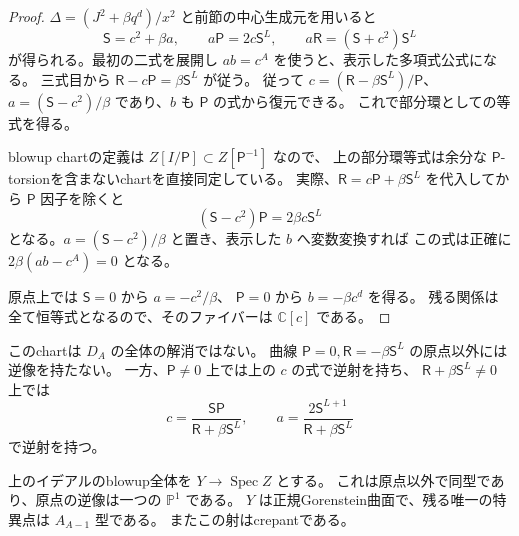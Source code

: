 \begin{proof}
$\Delta=(J^2+\beta q^d)/x^2$ と前節の中心生成元を用いると
\[
 \mathsf S=c^2+\beta a,\qquad
 a\mathsf P=2c\mathsf S^L,\qquad
 a\mathsf R=(\mathsf S+c^2)\mathsf S^L
\]
が得られる。最初の二式を展開し $ab=c^A$ を使うと、表示した多項式公式になる。
三式目から $\mathsf R-c\mathsf P=\beta\mathsf S^L$ が従う。
従って $c=(\mathsf R-\beta\mathsf S^L)/\mathsf P$、
$a=(\mathsf S-c^2)/\beta$ であり、$b$ も $\mathsf P$ の式から復元できる。
これで部分環としての等式を得る。

blowup chartの定義は $Z[I/\mathsf P]\subset Z[\mathsf P^{-1}]$ なので、
上の部分環等式は余分な $\mathsf P$-torsionを含まないchartを直接同定している。
実際、$\mathsf R=c\mathsf P+\beta\mathsf S^L$ を代入してから
$\mathsf P$ 因子を除くと
\[
 (\mathsf S-c^2)\mathsf P=2\beta c\mathsf S^L
\]
となる。$a=(\mathsf S-c^2)/\beta$ と置き、表示した $b$ へ変数変換すれば
この式は正確に $2\beta(ab-c^A)=0$ となる。

原点上では $\mathsf S=0$ から $a=-c^2/\beta$、
$\mathsf P=0$ から $b=-\beta c^d$ を得る。
残る関係は全て恒等式となるので、そのファイバーは $\mathbb C[c]$ である。
\end{proof}

このchartは $D_A$ の全体の解消ではない。
曲線 $\mathsf P=0,\mathsf R=-\beta\mathsf S^L$ の原点以外には逆像を持たない。
一方、$\mathsf P\ne0$ 上では上の $c$ の式で逆射を持ち、
$\mathsf R+\beta\mathsf S^L\ne0$ 上では
\[
 c=\frac{\mathsf S\mathsf P}{\mathsf R+\beta\mathsf S^L},\qquad
 a=\frac{2\mathsf S^{L+1}}{\mathsf R+\beta\mathsf S^L}
\]
で逆射を持つ。

\begin{corollary}[一曲線を取り出すcrepantな部分解消]
\label{cor:partial-resolution-v35}
上のイデアルのblowup全体を $Y\to\operatorname{Spec}Z$ とする。
これは原点以外で同型であり、原点の逆像は一つの $\mathbb P^1$ である。
$Y$ は正規Gorenstein曲面で、残る唯一の特異点は $A_{A-1}$ 型である。
またこの射はcrepantである。
\end{corollary}

